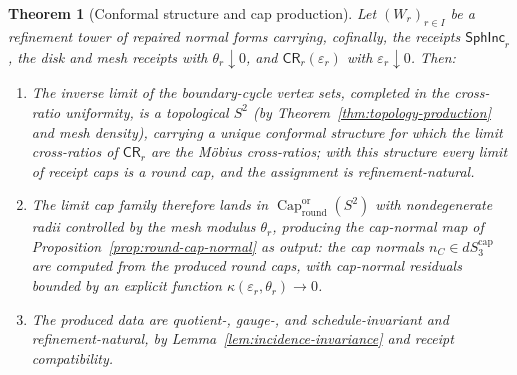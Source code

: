 \documentclass[11pt]{article}
\newtheorem{theorem}{Theorem}[section]
\begin{document}
\begin{theorem}[Conformal structure and cap production]
\label{thm:conformal-cap-production}
Let \((W_r)_{r\in I}\) be a refinement tower of repaired normal forms carrying,
cofinally, the receipts
\(\mathsf{SphInc}_r\), the disk and mesh receipts with \(\theta_r\downarrow0\),
and \(\mathsf{CR}_r(\varepsilon_r)\) with \(\varepsilon_r\downarrow0\). Then:
\begin{enumerate}[leftmargin=2em]
\item The inverse limit of the boundary-cycle vertex sets, completed in the
cross-ratio uniformity, is a topological \(S^2\) (by
Theorem~\ref{thm:topology-production} and mesh density), carrying a unique
conformal structure for which the limit cross-ratios of
\(\mathsf{CR}_r\) are the M\"obius cross-ratios; with this structure every
limit of receipt caps is a round cap, and the assignment is refinement-natural.
\item The limit cap family therefore lands in
\(\operatorname{Cap}^{\mathrm{or}}_{\mathrm{round}}(S^2)\) with nondegenerate
radii controlled by the mesh modulus \(\theta_r\), producing the cap-normal
map of Proposition~\ref{prop:round-cap-normal} \emph{as output}: the cap
normals \(n_C\in dS_3^{\mathrm{cap}}\) are computed from the produced round
caps, with cap-normal residuals bounded by an explicit function
\(\kappa(\varepsilon_r,\theta_r)\to0\).
\item The produced data are quotient-, gauge-, and schedule-invariant and
refinement-natural, by Lemma~\ref{lem:incidence-invariance} and receipt
compatibility.
\end{enumerate}
\end{theorem}
\end{document}
